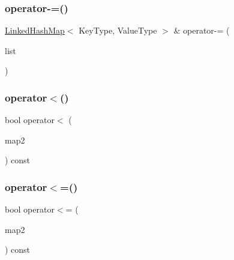 \mbox{\label{classLinkedHashMap_a391bba5f3e4ae6dfa5cd29609d3af004}} 
\subsubsection{\texorpdfstring{operator-\/=()}{operator-=()}\hspace{0.1cm}{\footnotesize\ttfamily [2/2]}}
{\footnotesize\ttfamily \mbox{\hyperlink{classLinkedHashMap}{Linked\+Hash\+Map}}$<$ Key\+Type, Value\+Type $>$ \& operator-\/= (\begin{DoxyParamCaption}\item[{std\+::initializer\+\_\+list$<$ std\+::pair$<$ Key\+Type, Value\+Type $>$ $>$}]{list }\end{DoxyParamCaption})}

\mbox{\label{classLinkedHashMap_a0943774682de2481db27e4469efb0eca}} 
\subsubsection{\texorpdfstring{operator$<$()}{operator<()}}
{\footnotesize\ttfamily bool operator$<$ (\begin{DoxyParamCaption}\item[{const \mbox{\hyperlink{classLinkedHashMap}{Linked\+Hash\+Map}}$<$ Key\+Type, Value\+Type $>$ \&}]{map2 }\end{DoxyParamCaption}) const}

\mbox{\label{classLinkedHashMap_afb27a9d637364adfd18ce35820a61e59}} 
\subsubsection{\texorpdfstring{operator$<$=()}{operator<=()}}
{\footnotesize\ttfamily bool operator$<$= (\begin{DoxyParamCaption}\item[{const \mbox{\hyperlink{classLinkedHashMap}{Linked\+Hash\+Map}}$<$ Key\+Type, Value\+Type $>$ \&}]{map2 }\end{DoxyParamCaption}) const}

